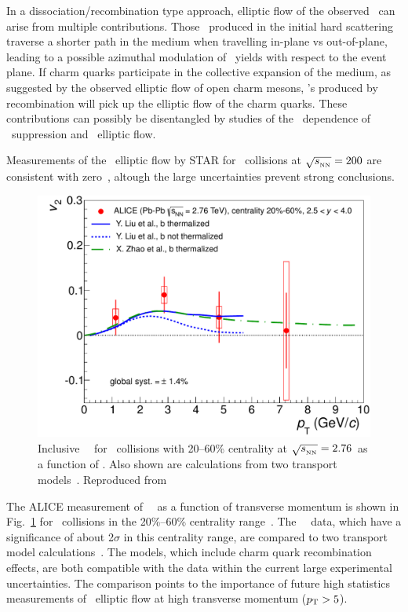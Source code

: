 In a dissociation/recombination type approach, elliptic flow of the observed \jpsi\ can arise from multiple
contributions. Those \jpsi\ produced in the initial hard scattering traverse a shorter path in the medium when
travelling in-plane vs out-of-plane, leading to a possible azimuthal modulation of \jpsi\ yields with respect
to the event plane. If charm quarks participate in the collective expansion of the medium, as
suggested by the observed elliptic flow of open charm mesons, \jpsi's produced by recombination will
pick up the elliptic flow of the charm quarks. These contributions can possibly be disentangled by
studies of the \pT\ dependence of \jpsi\ suppression and \jpsi\ elliptic flow.

Measurements of the \jpsi\ elliptic flow by STAR for \AuAu\ collisions at $\sqrt{s_{_{\rm NN}}} = 200$\GeV
are consistent with zero~\cite{Adamczyk:2012pw}, altough the large uncertainties prevent strong conclusions.
\begin{figure}
\begin{center}
\includegraphics[width=0.49\linewidth]{qqbarfigures/prl_fig4-eps-converted-to.pdf}
\caption{\label{fig:GR:v2ptcomp} Inclusive \jpsi\ \vtwo\
for \PbPb\ collisions with 20--60\% centrality at $\sqrt{s_{_{\rm NN}}} = 2.76$\TeV\ as a function of \pT.
Also shown are calculations from two transport models~\cite{Liu:2009gx,Zhao:2012gc}. 
Reproduced from~\cite{ALICE:2013xna}}
\end{center}
\end{figure}
The ALICE measurement of \jpsi\ \vtwo\ as a function of transverse momentum is shown in Fig.~\ref{fig:GR:v2ptcomp} for \PbPb\ collisions
in the 20\%--60\% centrality range~\cite{ALICE:2013xna}.
The \jpsi\ \vtwo\ data, which have a significance of about 2$\sigma$ in this centrality range, are compared to two
transport model calculations~\cite{Liu:2009gx,Zhao:2012gc}. The models, which include charm quark recombination effects,
are both compatible with the data within the current large experimental uncertainties. The comparison points to the
importance of future high statistics measurements of \jpsi\ elliptic flow at high transverse momentum ($\mbox{$p_{\mathrm{T}}$} > 5$\GeVc).


